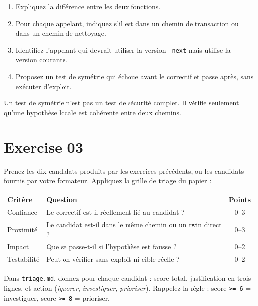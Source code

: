 \documentclass{training}
\begin{document}
\begin{enumerate}
  \item Expliquez la différence entre les deux fonctions.
  \item Pour chaque appelant, indiquez s'il est dans un chemin de
        transaction ou dans un chemin de nettoyage.
  \item Identifiez l'appelant qui devrait utiliser la version
        \texttt{\_next} mais utilise la version courante.
  \item Proposez un test de symétrie qui échoue avant le correctif et passe
        après, sans exécuter d'exploit.
\end{enumerate}

\begin{warn}
Un test de symétrie n'est pas un test de sécurité complet. Il vérifie
seulement qu'une hypothèse locale est cohérente entre deux chemins.
\end{warn}

\chapter{Exercise 03}
\makeheaderfiles

Prenez les dix candidats produits par les exercices précédents, ou les
candidats fournis par votre formateur. Appliquez la grille de triage du
papier :

\begin{center}
\begin{tabularx}{\linewidth}{|l|X|c|}
\hline
\textbf{Critère} & \textbf{Question} & \textbf{Points} \\ \hline
Confiance & Le correctif est-il réellement lié au candidat ? & 0--3 \\ \hline
Proximité & Le candidat est-il dans le même chemin ou un twin direct ? & 0--3 \\ \hline
Impact & Que se passe-t-il si l'hypothèse est fausse ? & 0--2 \\ \hline
Testabilit\'e & Peut-on vérifier sans exploit ni cible réelle ? & 0--2 \\ \hline
\end{tabularx}
\end{center}

Dans \texttt{triage.md}, donnez pour chaque candidat : score total,
justification en trois lignes, et action (\emph{ignorer},
\emph{investiguer}, \emph{prioriser}). Rappelez la règle : score
\texttt{>= 6} = investiguer, score \texttt{>= 8} = prioriser.
\end{document}
